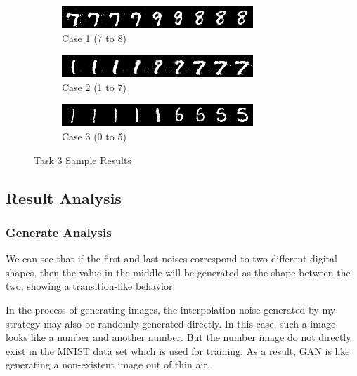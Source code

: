 \documentclass{article}
\begin{document}
\begin{figure}[!htbp]
  \centering
  \begin{subfigure}[b]{0.85\textwidth}
    \includegraphics[width=\textwidth]{img/p2t3/whole1.png}
    \caption{Case 1 (7 to 8)}
  \end{subfigure}
  \begin{subfigure}[b]{0.85\textwidth}
    \includegraphics[width=\textwidth]{img/p2t3/whole2.png}
    \caption{Case 2 (1 to 7)}
  \end{subfigure}
  \begin{subfigure}[b]{0.85\textwidth}
    \includegraphics[width=\textwidth]{img/p2t3/whole3.png}
    \caption{Case 3 (0 to 5)}
  \end{subfigure}
  \caption{Task 3 Sample Results}
  \label{fig:p2t3_results}
\end{figure}

\subsection{Result Analysis}

\subsubsection{Generate Analysis}

We can see that if the first and last noises correspond to two different digital shapes, then the value in the middle will be generated as the shape between the two, showing a transition-like behavior.

In the process of generating images, the interpolation noise generated by my strategy may also be randomly generated directly. In this case, such a image looks like a number and another number. But the number image do not directly exist in the MNIST data set which is used for training. As a result, GAN is like generating a non-existent image  out of thin air.
\end{document}
